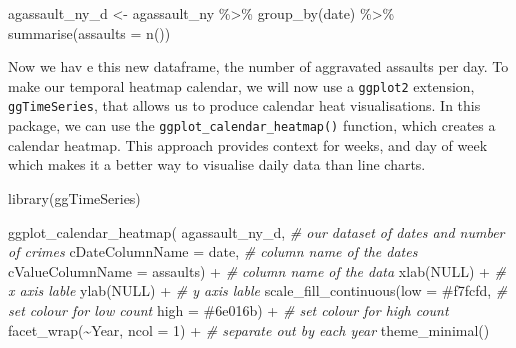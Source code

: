 \documentclass[
]{book}
\makeatletter
\newenvironment{Shaded}{\begin{snugshade}}{\end{snugshade}}
\newcommand{\AttributeTok}[1]{\textcolor[rgb]{0.61,0.61,0.61}{#1}}
\newcommand{\CommentTok}[1]{\textcolor[rgb]{0.37,0.37,0.37}{\textit{#1}}}
\newcommand{\ConstantTok}[1]{\textcolor[rgb]{0,0,0}{#1}}
\newcommand{\DecValTok}[1]{\textcolor[rgb]{0.06,0.06,0.06}{#1}}
\newcommand{\FunctionTok}[1]{\textcolor[rgb]{0,0,0}{#1}}
\newcommand{\NormalTok}[1]{#1}
\newcommand{\OtherTok}[1]{\textcolor[rgb]{0.37,0.37,0.37}{#1}}
\newcommand{\SpecialCharTok}[1]{\textcolor[rgb]{0,0,0}{#1}}
\newcommand{\StringTok}[1]{\textcolor[rgb]{0.5,0.5,0.5}{#1}}
\newenvironment{kframe}{%
\medskip{}
\setlength{\fboxsep}{.8em}
 \def\at@end@of@kframe{}%
 \ifinner\ifhmode%
  \def\at@end@of@kframe{\end{minipage}}%
  \begin{minipage}{\columnwidth}%
 \fi\fi%
 \def\FrameCommand##1{\hskip\@totalleftmargin \hskip-\fboxsep
 \colorbox{shadecolor}{##1}\hskip-\fboxsep
     \hskip-\linewidth \hskip-\@totalleftmargin \hskip\columnwidth}%
 \MakeFramed {\advance\hsize-\width
   \@totalleftmargin\z@ \linewidth\hsize
   \@setminipage}}%
 {\par\unskip\endMakeFramed%
 \at@end@of@kframe}
\renewenvironment{Shaded}{\begin{kframe}}{\end{kframe}}
\makeatother
\begin{document}
\begin{Shaded}
\begin{Highlighting}[]
\NormalTok{agassault\_ny\_d }\OtherTok{\textless{}{-}}\NormalTok{ agassault\_ny }\SpecialCharTok{\%\textgreater{}\%}
                    \FunctionTok{group\_by}\NormalTok{(date) }\SpecialCharTok{\%\textgreater{}\%}
                    \FunctionTok{summarise}\NormalTok{(}\AttributeTok{assaults =} \FunctionTok{n}\NormalTok{())}
\end{Highlighting}
\end{Shaded}

Now we hav
e this new dataframe, the number of aggravated assaults per day. To make our temporal heatmap calendar, we will now use a \texttt{ggplot2} extension, \texttt{ggTimeSeries}, that allows us to produce calendar heat visualisations. In this package, we can use the \texttt{ggplot\_calendar\_heatmap()} function, which creates a calendar heatmap. This approach provides context for weeks, and day of week which makes it a better way to visualise daily data than line charts.

\begin{Shaded}
\begin{Highlighting}[]
\FunctionTok{library}\NormalTok{(ggTimeSeries)}

\FunctionTok{ggplot\_calendar\_heatmap}\NormalTok{(}
\NormalTok{   agassault\_ny\_d,  }\CommentTok{\# our dataset of dates and number of crimes}
   \AttributeTok{cDateColumnName =} \StringTok{\textquotesingle{}date\textquotesingle{}}\NormalTok{, }\CommentTok{\# column name of the dates}
   \AttributeTok{cValueColumnName =} \StringTok{\textquotesingle{}assaults\textquotesingle{}}\NormalTok{) }\SpecialCharTok{+} \CommentTok{\# column name of the data}
   \FunctionTok{xlab}\NormalTok{(}\ConstantTok{NULL}\NormalTok{) }\SpecialCharTok{+} \CommentTok{\# x axis lable}
   \FunctionTok{ylab}\NormalTok{(}\ConstantTok{NULL}\NormalTok{) }\SpecialCharTok{+} \CommentTok{\# y axis lable}
   \FunctionTok{scale\_fill\_continuous}\NormalTok{(}\AttributeTok{low =} \StringTok{\textquotesingle{}\#f7fcfd\textquotesingle{}}\NormalTok{,  }\CommentTok{\# set colour for low count}
                         \AttributeTok{high =} \StringTok{\textquotesingle{}\#6e016b\textquotesingle{}}\NormalTok{) }\SpecialCharTok{+}   \CommentTok{\# set colour for high count}
  \FunctionTok{facet\_wrap}\NormalTok{(}\SpecialCharTok{\textasciitilde{}}\NormalTok{Year, }\AttributeTok{ncol =} \DecValTok{1}\NormalTok{) }\SpecialCharTok{+}  \CommentTok{\# separate out by each year}
  \FunctionTok{theme\_minimal}\NormalTok{()}
\end{Highlighting}
\end{Shaded}
\end{document}
